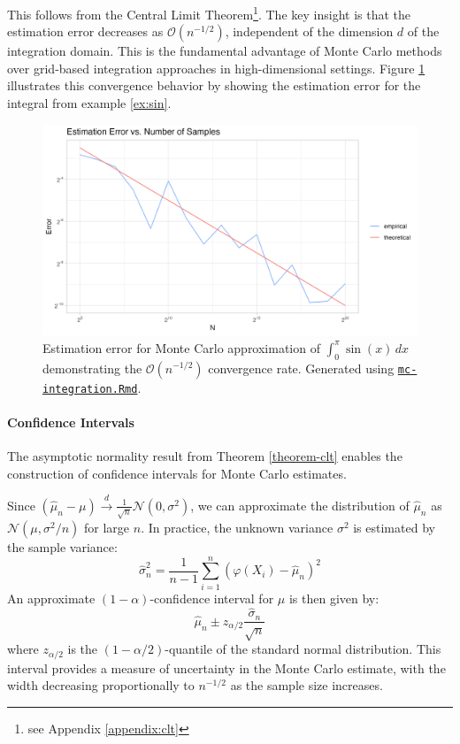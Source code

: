This follows from the Central Limit Theorem\footnote{see Appendix \ref{appendix:clt}}. The key insight is that the estimation error decreases as $\mathcal{O}(n^{-1/2})$, independent of the dimension $d$ of the integration domain. This is the fundamental advantage of Monte Carlo methods over grid-based integration approaches in high-dimensional settings. Figure \ref{fig:mc-integration2} illustrates this convergence behavior by showing the estimation error for the integral from example \ref{ex:sin}.
\begin{figure}[h]
    \centering
    \includegraphics[width=.8\linewidth]{figures/mc-integration2.png}
    \caption{Estimation error for Monte Carlo approximation of $\int_0^{\pi} \sin(x)\,dx$ demonstrating the $\mathcal{O}(n^{-1/2})$ convergence rate. Generated using \href{https://github.com/NikoGerman/Seminar/blob/main/Notebooks/mc-integration.Rmd}{\texttt{mc-integration.Rmd}}.}
    \label{fig:mc-integration2}
\end{figure}


\paragraph{Confidence Intervals}
The asymptotic normality result from Theorem \ref{theorem-clt} enables the construction of confidence intervals for Monte Carlo estimates. 

Since $(\hat{\mu}_n - \mu) \xrightarrow{d} \frac{1}{\sqrt{n}}\mathcal{N}(0, \sigma^2)$, we can approximate the distribution of $\hat{\mu}_n$ as $\mathcal{N}(\mu, \sigma^2/n)$ for large $n$. In practice, the unknown variance $\sigma^2$ is estimated by the sample variance:
\begin{equation}
\hat{\sigma}^2_n = \frac{1}{n-1}\sum_{i=1}^n(\varphi(X_i) - \hat{\mu}_n)^2
\end{equation}
An approximate $(1-\alpha)$-confidence interval for $\mu$ is then given by:
\begin{equation}
\hat{\mu}_n \pm z_{\alpha/2} \frac{\hat{\sigma}_n}{\sqrt{n}}
\end{equation}
where $z_{\alpha/2}$ is the $(1-\alpha/2)$-quantile of the standard normal distribution. This interval provides a measure of uncertainty in the Monte Carlo estimate, with the width decreasing proportionally to $n^{-1/2}$ as the sample size increases.